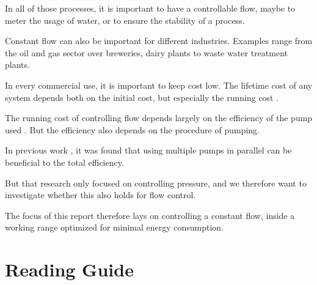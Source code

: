 In all of those processes,
it is important to have a controllable flow,
maybe to meter the usage of water,
or to ensure the stability of a process.

Constant flow can also be important for different industries.
Examples range from the oil and gas sector\cite{OilFlow} over breweries\cite{BrewFlow},
dairy plants\cite{DairyFlow} to waste water treatment plants\cite{WastewaterFlow}.

In every commercial use,
it is important to keep cost low.
The lifetime cost of any system depends both on the initial cost,
but especially the running cost .

The running cost of controlling flow depends largely on the efficiency of the pump used .
But the efficiency also depends on the procedure of pumping.

In previous work ,
it was found that using multiple pumps in parallel can be beneficial to the total efficiency.

But that research only focused on controlling pressure,
and we therefore want to investigate whether this also holds for flow control.

The focus of this report therefore lays on controlling a constant flow,
inside a working range optimized for minimal energy consumption.
%
%
%
%
%
%
%
%
%
%
%
%

\section*{Reading Guide}
